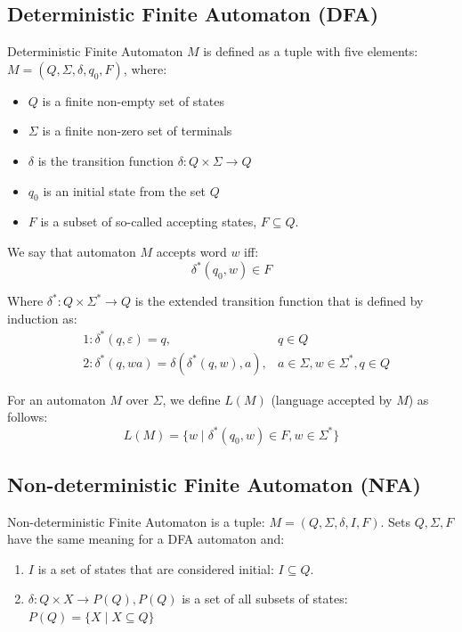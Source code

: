 \documentclass{ctuthesis}
\begin{document}
\subsection{Deterministic Finite Automaton (DFA)}
Deterministic Finite Automaton $M$ is defined as a tuple with five elements: $M = (Q, \Sigma, \delta, q_0, F)$, where:
\begin{itemize}
	\item $Q$ is a finite non-empty set of states
	\item $\Sigma$ is a finite non-zero set of terminals
	\item $\delta$ is the transition function $\delta : Q \times \Sigma \rightarrow Q$
	\item $q_0$ is an initial state from the set $Q$
	\item $F$ is a subset of so-called accepting states, $F \subseteq Q$.
\end{itemize}

We say that automaton $M$ accepts word $w$ iff:
\begin{equation*}
	\delta^*(q_0, w) \in F
\end{equation*}

Where $\delta^* : Q \times \Sigma^* \rightarrow Q$ is the extended transition function that is defined by induction as:
\begin{align*}
	&1: \delta^*(q, \varepsilon) = q, &q \in Q \\
	&2: \delta^*(q, wa) = \delta(\delta^*(q, w), a), &a \in \Sigma, w \in \Sigma^*, q \in Q
\end{align*}

For an automaton $M$ over $\Sigma$, we define $L(M)$ (language accepted by $M$) as follows:
\begin{equation*}
	L(M) = \{w \mid \delta^*(q_0, w) \in F, w \in \Sigma^*\}
\end{equation*}

\subsection{Non-deterministic Finite Automaton (NFA)}
Non-deterministic Finite Automaton is a tuple: $M = (Q, \Sigma, \delta, I, F)$. Sets $Q, \Sigma, F$ have the same meaning for a DFA automaton and: 
\begin{enumerate}
	\item $I$ is a set of states that are considered initial: $I \subseteq Q$.
	\item $\delta : Q \times X \rightarrow P(Q), P(Q)$ is a set of all subsets of states: $P(Q) = \{X \mid X \subseteq Q\}$
\end{enumerate}
\end{document}
